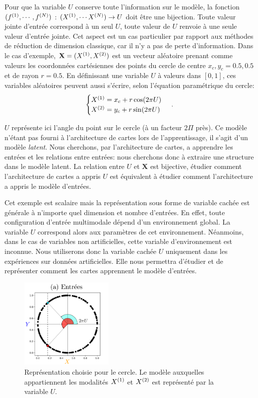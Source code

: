 Pour que la variable $U$ conserve toute l'information sur le modèle, la fonction $(f^{({1})}, \cdots, f^{({N})})$ : $(X^{({1})}, \cdots X^{({N})})\rightarrow U$ doit être une bijection. Toute valeur jointe d'entrée correspond à un seul $U$, toute valeur de $U$ renvoie à une seule valeur d'entrée jointe. 
Cet aspect est un cas particulier par rapport aux méthodes de réduction de dimension classique, car il n'y a pas de perte d'information.
Dans le cas d'exemple, $\mathbf{X} = (X^{({1})},X^{({2})})$ est un vecteur aléatoire prenant comme valeurs les coordonnées cartésiennes des points du cercle de centre $x_c,y_c = 0.5,0.5$ et de rayon $r = 0.5$.
En définissant une variable $U$ à valeurs dans $[0,1]$, ces variables aléatoires peuvent aussi s'écrire, selon l'équation paramétrique du cercle:
\begin{equation}
 \begin{cases}
     X^{({1})}= x_c + r  \cos(2\pi U)\\
     X^{({2})} = y_c + r \sin(2 \pi U)
    \end{cases}\,.
\end{equation}

$U$ représente ici l'angle du point sur le cercle (à un facteur $2\Pi$ près).
Ce modèle n'étant pas fourni à l'architecture de cartes lors de l'apprentissage, il s'agit d'un modèle \emph{latent}.
Nous cherchons, par l'architecture de cartes, a apprendre les entrées et les relations entre entrées: nous cherchons donc à extraire une structure dans le modèle latent. La relation entre $U$ et $\mathbf{X}$ est bijective, étudier comment l'architecture de cartes a appris $U$ est équivalent à étudier comment l'architecture a appris le modèle d'entrées.

Cet exemple est scalaire mais la représentation sous forme de variable cachée est générale à n'importe quel dimension et nombre d'entrées.
En effet, toute configuration d'entrée multimodale dépend d'un environnement global. La variable $U$ correspond alors aux paramètres de cet environnement. Néanmoins, dans le cas de variables non artificielles, cette variable d'environnement est inconnue. Nous utiliserons donc la variable cachée $U$ uniquement dans les expériences sur données artificielles. Elle nous permettra d'étudier et de représenter comment les cartes apprennent le modèle d'entrées.

\begin{figure}
\centering
\includegraphics[width=0.4\textwidth]{2som_inp.pdf}
\caption{Représentation choisie pour le cercle. Le modèle auxquelles appartiennent les modalités $X^{({1})}$ et $X^{({2})}$ est représenté par la variable $U$. \label{fig:U}}
\end{figure}


